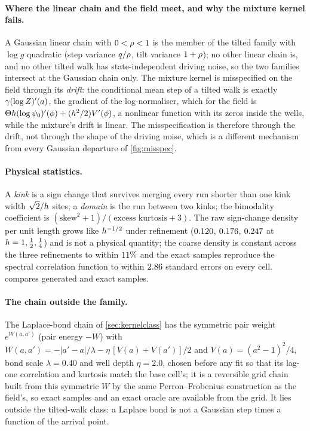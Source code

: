 \paragraph{Where the linear chain and the field meet, and why the mixture kernel fails.}
A Gaussian linear chain with $0<\rho<1$ is the member of the tilted family with $\log g$ quadratic (step variance $q/\rho$, tilt variance $1+\rho$);
no other linear chain is, and no other tilted walk has state-independent driving noise, so the two families intersect at the Gaussian chain only. The
mixture kernel is misspecified on the field through its \emph{drift}: the conditional mean step of a tilted walk is exactly $\gamma(\log Z)'(a)$, the
gradient of the log-normaliser, which for the field is $\Theta h(\log\psi_0)'(\phi)+(h^2/2)V'(\phi)$, a nonlinear function with its zeros inside the wells,
while the mixture's drift is linear. The misspecification is therefore through the drift, not through the shape of the driving noise, which is a different
mechanism from every Gaussian departure of \cref{fig:misspec}.



\paragraph{Physical statistics.}
A \emph{kink} is a sign change that survives merging every run shorter than one kink width $\sqrt2/h$ sites; a \emph{domain} is the run between two kinks;
the bimodality coefficient is $(\text{skew}^2+1)/(\text{excess kurtosis}+3)$. The raw sign-change density per unit length grows like $h^{-1/2}$ under
refinement ($0.120$, $0.176$, $0.247$ at $h=1,\tfrac12,\tfrac14$) and is not a physical quantity; the coarse density is constant
across the three refinements to within $11\%$ and the exact samples reproduce the spectral correlation function to within
$2.86$ standard errors on every cell.  compares generated and exact samples.

\paragraph{The chain outside the family.}
The Laplace-bond chain of \cref{sec:kernelclass} has the symmetric pair weight $e^{W(a,a')}$ (pair energy $-W$) with $W(a,a')=-|a'-a|/\lambda-\eta\,[V(a)+V(a')]/2$ and $V(a)=(a^2-1)^2/4$, bond scale $\lambda=0.40$ and well depth $\eta=2.0$,
chosen before any fit so that its lag-one correlation and kurtosis match the base cell's; it is a reversible grid chain built from this symmetric $W$ by the same Perron--Frobenius construction as the field's, so exact samples and an exact oracle are available from the grid.
It lies outside the tilted-walk class: a Laplace bond is not a Gaussian step times a function of the arrival point.

